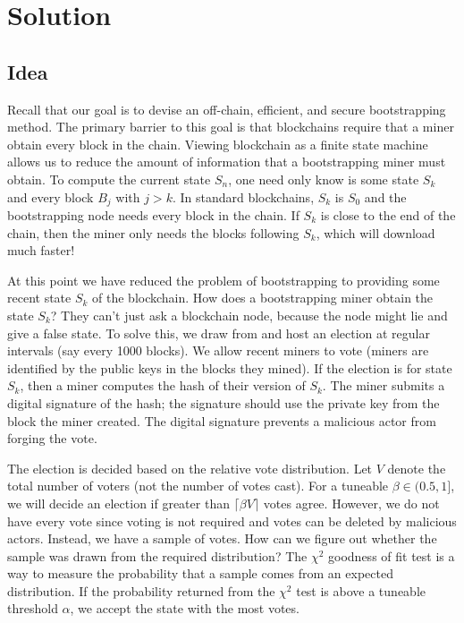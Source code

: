 \section{Solution}
\label{sec:solution}

\subsection{Idea}

Recall that our goal is to devise an off-chain, efficient, and secure bootstrapping method.
The primary barrier to this goal is that blockchains require that a miner obtain every block in the chain.
Viewing blockchain as a finite state machine allows us to reduce the amount of information that a bootstrapping miner must obtain.
To compute the current state $S_n$, one need only know is some state $S_k$ and every block $B_j$ with $j > k$.
In standard blockchains, $S_k$ is $S_0$ and the bootstrapping node needs every block in the chain.
If $S_k$ is close to the end of the chain, then the miner only needs the blocks following $S_k$, which will download much faster!

At this point we have reduced the problem of bootstrapping to providing some recent state $S_k$ of the blockchain.
How does a bootstrapping miner obtain the state $S_k$?
They can't just ask a blockchain node, because the node might lie and give a false state.
To solve this, we draw from \cite{matzutt2020HowTSPrune} and host an election at regular intervals (say every 1000 blocks).
We allow recent miners to vote (miners are identified by the public keys in the blocks they mined).
If the election is for state $S_k$, then a miner computes the hash of their version of $S_k$.
The miner submits a digital signature of the hash; the signature should use the private key from the block the miner created.
The digital signature prevents a malicious actor from forging the vote.

The election is decided based on the relative vote distribution.
Let $V$ denote the total number of voters (not the number of votes cast).
For a tuneable $\beta \in (0.5,1]$, we will decide an election if greater than $\lceil \beta V \rceil$ votes agree.
However, we do not have every vote since voting is not required and votes can be deleted by malicious actors.
Instead, we have a sample of votes.
How can we figure out whether the sample was drawn from the required distribution?
The $\chi ^2$ goodness of fit test is a way to measure the probability that a sample comes from an expected distribution.
If the probability returned from the $\chi ^2$ test is above a tuneable threshold $\alpha$, we accept the state with the most votes.

